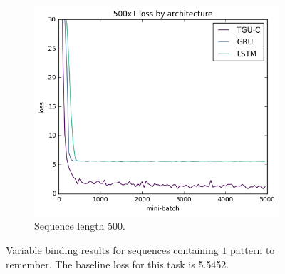 \begin{figure}[p]
\begin{subfigure}[t]{0.3\linewidth}
	\includegraphics[width=\linewidth]{exps/vbind/plots/500x1}
	\caption{Sequence length 500.}
\end{subfigure}

\caption[Variable binding results, one pattern]
{Variable binding results for sequences containing \(1\) pattern to remember. The baseline loss for this
task is 5.5452.}
\label{fig:vbindn1}
\end{figure}

